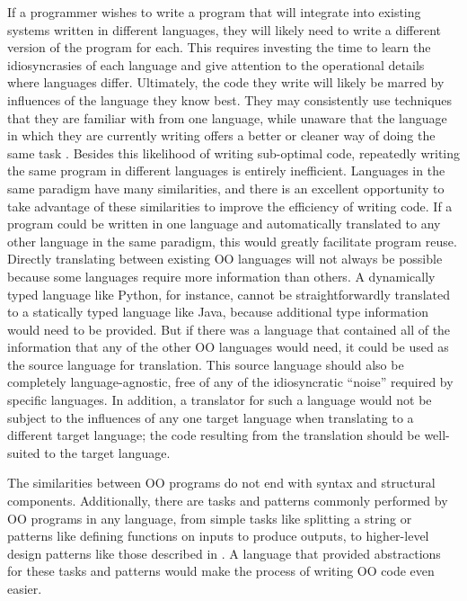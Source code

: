 \documentclass[sigplan,review,anonymous]{acmart}\settopmatter{printfolios=true,printccs=false,printacmref=false}
\begin{document}
If a programmer wishes to write a program that will integrate into 
existing systems written in different languages, they will likely need to 
write a different version of the program for each. This 
requires investing the time to learn the idiosyncrasies of each language and 
give attention to the operational details where languages differ. Ultimately, 
the code they write will likely be marred by influences of the language they 
know best. They may consistently use techniques that they are familiar with 
from one language, while unaware that the language in which they are currently 
writing offers a better or cleaner way of doing the same task 
\cite{ScholtzWiedenbeck, AlexandronEtAl}. Besides this 
likelihood of writing sub-optimal code, repeatedly writing the same program in 
different languages is entirely inefficient. 
Languages in the same paradigm have many similarities, and there is an 
excellent opportunity to take advantage of these similarities to improve the
efficiency of writing code. If a program could be written in one language and
automatically translated to any other language in the same paradigm, this would
greatly facilitate program reuse. Directly translating between existing 
OO languages will not always be possible because some languages 
require more information than others. A dynamically typed language like Python, 
for instance, cannot be straightforwardly translated to a statically typed 
language like Java, because additional type information would need to be 
provided. But if there was a language that contained all of the information 
that any of the other OO languages would need, it could be used as the source 
language for translation. This source language should also be completely 
language-agnostic, free of any of the idiosyncratic ``noise'' required by
specific languages. In addition, a translator for such a language would not be 
subject to the influences of any one target language when translating to a 
different target language; the code resulting from the translation should be 
well-suited to the target language.

The similarities between OO programs do not end with syntax and structural 
components. Additionally, there are tasks and patterns commonly performed by OO
programs in any language, from simple tasks like splitting a string or 
patterns like defining functions on inputs to produce outputs, to higher-level 
design patterns like those described in \cite{DesignPatterns}. A language 
that provided abstractions for these tasks and patterns would make the process 
of writing OO code even easier.
\end{document}
